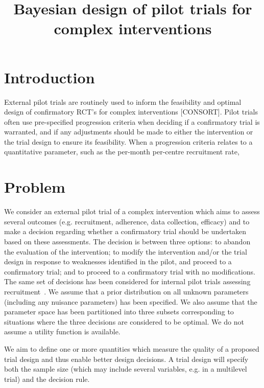 \documentclass{article} %
\title{Bayesian design of pilot trials for complex interventions}
\begin{document}
\maketitle

\section{Introduction}

External pilot trials are routinely used to inform the feasibility and optimal design of confirmatory RCT's for complex interventions [CONSORT].
Pilot trials often use pre-specified progression criteria when deciding if a confirmatory trial is warranted, and if any adjustments should be made to either the intervention or the trial design to ensure its feasibility.
When a progression criteria relates to a quantitative parameter, such as the per-month per-centre recruitment rate, 

\section{Problem}

We consider an external pilot trial of a complex intervention which aims to assess several outcomes (e.g. recruitment, adherence, data collection, efficacy) and to make a decision regarding whether a confirmatory trial should be undertaken based on these assessments. The decision is between three options: to abandon the evaluation of the intervention; to modify the intervention and/or the trial design in response to weaknesses identified in the pilot, and proceed to a confirmatory trial; and to proceed to a confirmatory trial with no modifications. The same set of decisions has been considered for internal pilot trials assessing recruitment~\cite{Hampson2017}. We assume that a prior distribution on all unknown parameters (including any nuisance parameters) has been specified. We also assume that the parameter space has been partitioned into three subsets corresponding to situations where the three decisions are considered to be optimal. We do not assume a utility function is available.

We aim to define one or more quantities which measure the quality of a proposed trial design and thus enable better design decisions. A trial design will specify both the sample size (which may include several variables, e.g. in a multilevel trial) and the decision rule.

\end{document}
